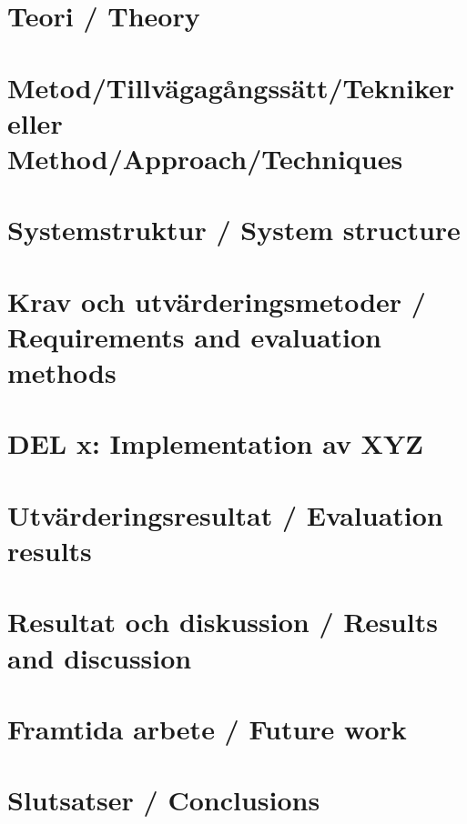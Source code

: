 \documentclass[a4paper,12pt]{article}
\begin{document}
\section{Teori / Theory}
\label{sec:teori}


\section{Metod/Tillvägagångssätt/Tekniker eller Method/Approach/Techniques}
\label{sec:metod}


\section{Systemstruktur / System structure}
\label{sec:systemstruktur}


\section{Krav och utvärderingsmetoder / Requirements and evaluation methods}
\label{sec:krav}


\section{DEL x: Implementation av XYZ}
\label{sec:del-x}


\section{Utvärderingsresultat / Evaluation results}


\section{Resultat och diskussion / Results and discussion}
\label{sec:resultat}


\section{Framtida arbete / Future work}
\label{sec:framtida}


\section{Slutsatser / Conclusions}
\label{sec:slutsatser}

\end{document}
